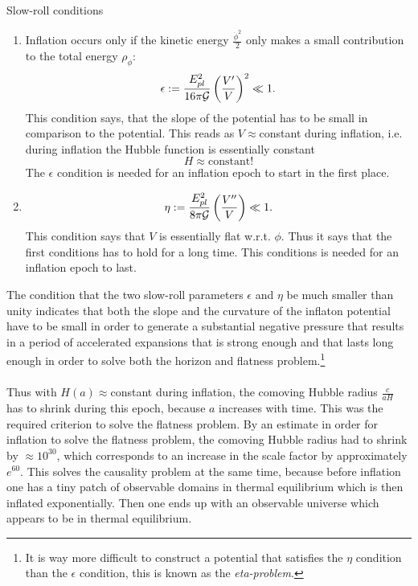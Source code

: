 \begin{mybox}{Slow-roll conditions}
\begin{enumerate}
	\item Inflation occurs only if the kinetic energy $\frac{\dot{\phi}^2}{2}$ only makes a small contribution to the total energy $\rho_\phi$:
	\begin{equation}
\epsilon := \frac{E^2_{pl}}{16 \pi \mathcal{G}} \left( \frac{V^\prime}{V}\right)^2 \ll 1.
	\end{equation}
	This condition says, that the slope of the potential has to be small in comparison to the potential. This reads as $V\approx$constant during inflation, i.e. during inflation the Hubble function is essentially constant
	\begin{equation}
		H\approx \text{constant} !
	\end{equation}
	The $\epsilon$ condition is needed for an inflation epoch to start in the first place.
	\item 
	\begin{equation}
		\eta := \frac{E^2_{pl}}{8 \pi \mathcal{G}} \left(\frac{V^{\prime \prime} }{V}\right) \ll 1.
	\end{equation}
	This condition says that $V$ is essentially flat w.r.t. $\phi$. Thus it says that the first conditions has to hold for a long time. This conditions is needed for an inflation epoch to last.
\end{enumerate}
\end{mybox}
The condition that the two slow-roll parameters $\epsilon$ and $\eta$ be much smaller than unity indicates that both the slope and the curvature of the inflaton potential have to be small in order to generate a substantial negative pressure that results in a period of accelerated expansions that is strong enough and that lasts long enough in order to solve both the horizon and flatness problem.\footnote{It is way more difficult to construct a potential that satisfies the $\eta$ condition than the $\epsilon$ condition, this is known as the \emph{eta-problem}.}\\
\\
Thus with $H(a)\approx$constant during inflation, the comoving Hubble radius $\frac{c}{aH}$ has to shrink during this epoch, because $a$ increases with time. This was the required criterion to solve the flatness problem. By an estimate in order for inflation to solve the flatness problem, the comoving Hubble radius had to shrink by $\approx 10^30$, which corresponds to an increase in the scale factor by approximately $e^{60}$. This solves the causality problem at the same time, because before inflation one has a tiny patch of observable domains in thermal equilibrium which is then inflated exponentially. Then one ends up with an observable universe which appears to be in thermal equilibrium.\\
